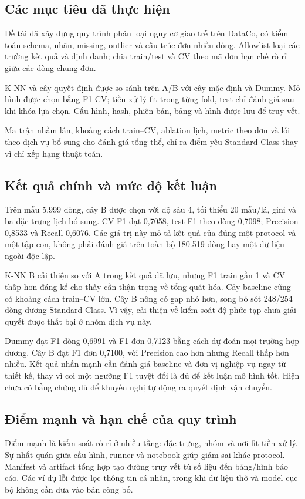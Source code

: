\subsection{Các mục tiêu đã thực hiện}
Đề tài đã xây dựng quy trình phân loại nguy cơ giao trễ trên DataCo,
có kiểm toán schema, nhãn, missing, outlier và cấu trúc đơn nhiều dòng.
Allowlist loại các trường kết quả và định danh; chia train/test và CV
theo mã đơn hạn chế rò rỉ giữa các dòng chung đơn.

K-NN và cây quyết định được so sánh trên A/B với cây mặc định và Dummy.
Mô hình được chọn bằng F1 CV; tiền xử lý fit trong từng fold, test chỉ
đánh giá sau khi khóa lựa chọn. Cấu hình, hash, phiên bản, bảng và hình
được lưu để truy vết.

Ma trận nhầm lẫn, khoảng cách train--CV, ablation lịch, metric theo đơn
và lỗi theo dịch vụ bổ sung cho đánh giá tổng thể, chỉ ra điểm yếu
Standard Class thay vì chỉ xếp hạng thuật toán.

\subsection{Kết quả chính và mức độ kết luận}
Trên mẫu 5.999 dòng, cây B được chọn với độ sâu 4, tối thiểu 20 mẫu/lá,
gini và ba đặc trưng lịch bổ sung. CV F1 đạt 0,7058, test F1 theo dòng
0,7098; Precision 0,8533 và Recall 0,6076. Các giá trị này mô tả kết quả
của đúng một protocol và một tập con, không phải đánh giá trên toàn bộ
180.519 dòng hay một dữ liệu ngoài độc lập.

K-NN B cải thiện so với A trong kết quả đã lưu, nhưng F1 train gần 1 và
CV thấp hơn đáng kể cho thấy cần thận trọng về tổng quát hóa. Cây baseline
cũng có khoảng cách train--CV lớn. Cây B nông có gap nhỏ hơn, song bỏ sót
248/254 dòng dương Standard Class. Vì vậy, cải thiện về kiểm soát độ phức
tạp chưa giải quyết được thất bại ở nhóm dịch vụ này.

Dummy đạt F1 dòng 0,6991 và F1 đơn 0,7123 bằng cách dự đoán mọi trường
hợp dương. Cây B đạt F1 đơn 0,7100, với Precision cao hơn nhưng Recall
thấp hơn nhiều. Kết quả nhấn mạnh cần đánh giá baseline và đơn vị nghiệp
vụ ngay từ thiết kế, thay vì coi một ngưỡng F1 tuyệt đối là đủ để kết
luận mô hình tốt. Hiện chưa có bằng chứng đủ để khuyến nghị tự động ra
quyết định vận chuyển.

\subsection{Điểm mạnh và hạn chế của quy trình}
Điểm mạnh là kiểm soát rò rỉ ở nhiều tầng: đặc trưng, nhóm và nơi fit
tiền xử lý. Sự nhất quán giữa cấu hình, runner và notebook giúp giảm sai
khác protocol. Manifest và artifact tổng hợp tạo đường truy vết từ số
liệu đến bảng/hình báo cáo. Các ví dụ lỗi được lọc thông tin cá nhân,
trong khi dữ liệu thô và model cục bộ không cần đưa vào bản công bố.

